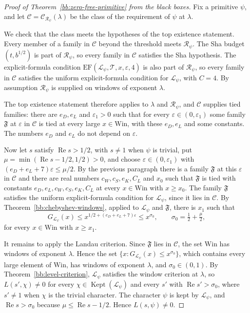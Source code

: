 \documentclass[11pt]{amsbook}
\theoremstyle{plain}
\theoremstyle{definition}
\theoremstyle{remark}
\numberwithin{equation}{section}
\numberwithin{figure}{chapter}
\numberwithin{table}{chapter}
\newcommand{\eps}{\varepsilon}
\newcommand{\lev}{\mathscr{L}}
\newcommand{\Kept}{\operatorname{Kept}}
\newcommand{\Top}{\mathcal{T}}
\newcommand{\Fam}{\mathfrak{F}}
\newcommand{\Win}{\mathrm{Win}}
\begin{document}
\begin{proof}[Proof of Theorem~\ref{bb:zero-free-primitive} from the
black boxes]
Fix a primitive $\psi$, and let
$\mathcal C=\mathcal C_{\mathscr R_\psi}(\lambda)$ be the class of
the requirement of $\psi$ at $\lambda$.

We check that the class meets the hypotheses of the top existence
statement. Every member of a family in $\mathcal C$ beyond the
threshold meets $\mathscr R_\psi$. The Sha budget $(t,b^{1/2})$ is
part of $\mathscr R_\psi$, so every family in $\mathcal C$ satisfies
the Sha hypothesis. The explicit-formula condition
$\mathrm{EF}(\lev_\psi,\Top,x,\eps,4)$ is also part of
$\mathscr R_\psi$, so every family in $\mathcal C$ satisfies the
uniform explicit-formula condition for $\lev_\psi$, with $C=4$. By
assumption $\mathscr R_\psi$ is supplied on windows of exponent
$\lambda$.

The top existence statement therefore applies
to $\lambda$ and $\mathscr R_\psi$, and $\mathcal C$ supplies tied
families: there are $e_D,e_L$ and $\eps_1>0$ such that for every
$\eps\in(0,\eps_1)$ some family $\Fam$ at $\eps$ in $\mathcal C$ is
tied at every large $x\in\Win$, with these $e_D,e_L$ and some
constants. The numbers $e_D$ and $e_L$ do not depend on $\eps$.

Now let $s$ satisfy $\operatorname{Re}s>1/2$, with $s\ne1$ when
$\psi$ is trivial, put
$\mu=\min(\operatorname{Re}s-1/2,1/2)>0$, and choose
$\eps\in(0,\eps_1)$ with $(e_D+e_L+7)\eps\le\mu/2$. By the previous
paragraph there is a family $\Fam$ at this $\eps$ in $\mathcal C$
and there are real numbers $c_W,c_S,e_K,C_L$ and $x_0$ such that
$\Fam$ is tied with constants $e_D,e_L,c_W,c_S,e_K,C_L$ at every
$x\in\Win$ with $x\ge x_0$. The family $\Fam$ satisfies the uniform
explicit-formula condition for $\lev_\psi$, since it lies in
$\mathcal C$. By Theorem~\ref{bb:chebyshev-windows}, applied to
$\lev_\psi$ and $\Fam$, there is $x_1$ such that
\[
G_{\lev_\psi}(x)\le x^{1/2+(e_D+e_L+7)\eps}\le x^{\sigma_0},
\qquad \sigma_0=\tfrac12+\tfrac\mu2,
\]
for every $x\in\Win$ with $x\ge x_1$.

It remains to apply the Landau criterion. Since $\Fam$ lies in
$\mathcal C$, the
set $\Win$ has windows of exponent $\lambda$. Hence the set
$\{x:G_{\lev_\psi}(x)\le x^{\sigma_0}\}$, which contains every large
element of $\Win$, has windows of exponent $\lambda$, and
$\sigma_0\in(0,1)$. By Theorem~\ref{bb:level-criterion}, $\lev_\psi$
satisfies the window criterion at $\lambda$, so $L(s',\chi)\ne0$ for
every $\chi\in\Kept(\lev_\psi)$ and every $s'$ with
$\operatorname{Re}s'>\sigma_0$, where $s'\ne1$ when $\chi$ is the
trivial character. The character $\psi$ is kept by $\lev_\psi$, and
$\operatorname{Re}s>\sigma_0$ because
$\mu\le\operatorname{Re}s-1/2$. Hence $L(s,\psi)\ne0$.
\end{proof}
\end{document}
